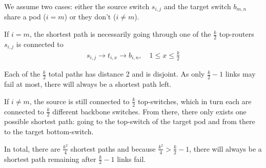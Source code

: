 \documentclass{article}
\begin{document}


We assume two cases: either the source switch $s_{i,j}$ and the target switch $b_{m,n}$ share a pod ($i=m$) or they don't ($i\neq m$).

If $i=m$, the shortest path is necessarily going through one of the $\frac{k}{2}$ top-routers $s_{i,j}$ is connected to
\begin{align*}
    s_{i,j}\to t_{i,x} \to b_{i,n},   \quad 1\leq x \leq \frac{k}{2}
\end{align*}

Each of the $\frac{k}{2}$ total paths has distance 2 and is disjoint. As only $\frac{k}{2}-1$ links may fail at most, there will always be a shortest path left.

If $i\neq m$, the source is still connected to $\frac{k}{2}$ top-switches, which in turn each are connected to $\frac{k}{2}$ different backbone switches. From there, there only exists one possible shortest path: going to the top-switch of the target pod and from there to the target bottom-switch.

In total, there are $\frac{k^2}{4}$ shortest paths and because $\frac{k^2}{4}>\frac{k}{2}-1$, there will always be a shortest path remaining after $\frac{k}{2}-1$ links fail.






    

    \section{}
\end{document}

